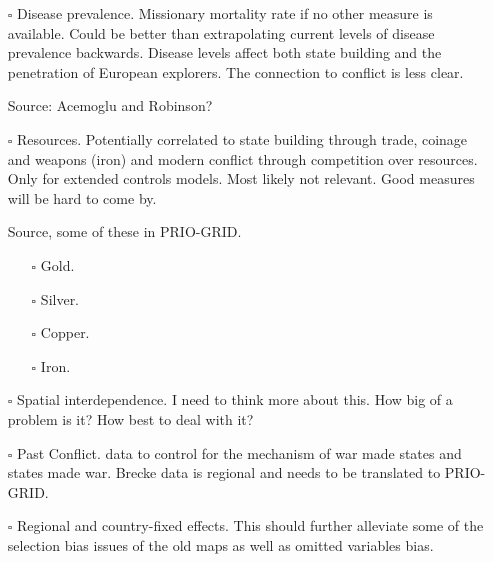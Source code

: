 \documentclass[12pt]{article}
\begin{document}
\begin{itemize}
	\item[$\square$] Disease prevalence. Missionary mortality rate if no
		other measure is available. Could be better than extrapolating
		current levels of disease prevalence backwards. Disease levels 
		affect both state building and the penetration of
		European explorers. The connection to conflict is less clear.

		Source: Acemoglu and Robinson?

	\item[$\square$] Resources. Potentially correlated to state building
		through trade, coinage and weapons (iron) and modern conflict
		through competition over resources. Only for extended controls
		models. Most likely not relevant. Good measures will be hard to
		come by.

		Source, some of these in PRIO-GRID.
	\begin{itemize}
		\item[$\square$] Gold.

		\item[$\square$] Silver.
			
		\item[$\square$] Copper.

		\item[$\square$] Iron.
	\end{itemize}

	\item[$\square$] Spatial interdependence. I need to think more about
		this. How big of a problem is it? How best to deal with it?

	\item[$\square$] Past Conflict. \citet{Brecke1999} data to control for
		the \citet{Tilly1990} mechanism of war made states and states
		made war. Brecke data is regional and needs to be translated to
		PRIO-GRID.

	\item[$\square$] Regional and country-fixed effects. This should further
		alleviate some of the selection bias issues of the old maps as
		well as omitted variables bias.
\end{itemize}
\end{document}
